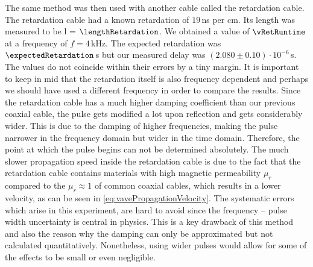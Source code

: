 \documentclass[a4paper,10pt,twocolumn]{article}
\begin{document}
    The same method was then used with another cable called the retardation cable.
    The retardation cable had a known retardation of $19\,$ns per cm.
    Its length was measured to be l = $\lengthRetardation$.
    We obtained a value of $\vRetRuntime$ at a frequency of $f = 4\,$kHz.
    The expected retardation was $\expectedRetardation\,$s but our measured delay was $(2.080\pm 0.10)\cdot10^{-6}\,$s.
    The values do not coincide within their errors by a tiny margin.
    It is important to keep in mid that the retardation itself is also frequency dependent and perhaps we should have used a different frequency in order to compare the results.
    Since the retardation cable has a much higher damping coefficient than our previous coaxial cable,
    the pulse gets modified a lot upon reflection and gets considerably wider.
    This is due to the damping of higher frequencies, making the pulse narrower in the frequency domain but wider in the time domain.
    Therefore, the point at which the pulse begins can not be determined absolutely.
    The much slower propagation speed inside the retardation cable is due to the fact that the retardation cable contains materials with high magnetic permeability $\mu_r$ compared to the $\mu_r \approx 1 $ of
    common coaxial cables, which results in a lower velocity, as can be seen in \autoref{eq:vavePropagationVelocity}.
    The systematic errors which arise in this experiment, are hard to avoid since the frequency -- pulse width uncertainty is central in physics.
    This is a key drawback of this method and also the reason why the damping can only be approximated but not calculated quantitatively.
    Nonetheless, using wider pulses would allow for some of the effects to be small or even negligible.
\end{document}
